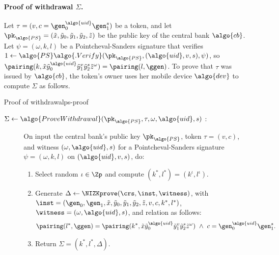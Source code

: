     \paragraph{Proof of withdrawal $\Sigma$.}\label{sec:ps-proof} Let $\tau =
    (v, c = \gen_0^{\algo{uid}} \gen_1^s)$ be a token, and let $\pk_{\algo{PS}}
    = (\tilde{x}, \tilde{y}_0, \tilde{y}_1, \tilde{y}_2, \tilde{z})$ be the
    public key of the central bank $\algo{cb}$. Let $\psi = (\omega, k, l)$ be
    a Pointcheval-Sanders signature that verifies $1 \gets
    \algo{PS}\algo{.Verify}(\pk_{\algo{PS}}, (\algo{uid}, v, s), \psi)$, so
    $\pairing(k, \tilde{x} \tilde{y}_0^{\algo{uid}} \tilde{y}_1^v \tilde{y}_2^s
    \tilde{z}^\omega) = \pairing(l, \ggen)$. To prove that $\tau$ was issued by
    $\algo{cb}$, the token's owner uses her mobile device $\algo{dev}$ to
    compute $\Sigma$ as follows.

    \begin{protocolbox}{Proof of withdrawal}{ps-proof}

      \begin{description}

        \item[$\Sigma \leftarrow \algo{ProveWithdrawal}(\pk_{\algo{PS}}, \tau,
          \omega, \algo{uid}, s)$ :] On input the central bank's public key
          $\pk_{\algo{PS}}$, token $\tau = (v, c)$, and witness $(\omega,
          \algo{uid}, s)$ for a Pointcheval-Sanders signature $\psi = (\omega,
          k, l)$ on $(\algo{uid}, v, s)$, do:

          \begin{enumerate}

            \item Select random $\iota \in \Zp$ and compute $(k^*, l^*) =
              (k^\iota, l^\iota)$.

            \item Generate $\Delta \leftarrow \NIZKprove(\crs, \inst,
              \witness)$, with $\inst = (\gen_0, \gen_1, \tilde{x},
              \tilde{y}_0, \tilde{y}_1, \tilde{y}_2, \tilde{z}, v, c, k^*,
              l^*)$, $\witness = (\omega, \algo{uid}, s)$, and relation as
              follows:
              \begin{align*}
                \pairing(l^*, \ggen) &= \pairing(k^*, \tilde{x}
                \tilde{y}_0^{\algo{uid}} \tilde{y}_1^v \tilde{y}_2^s
                \tilde{z}^\omega) \ \wedge \ c = \gen_0^{\algo{uid}} \gen_1^s.
              \end{align*}

            \item Return $\Sigma = (k^*, l^*, \Delta)$.

          \end{enumerate}

      \end{description}

    \end{protocolbox}

